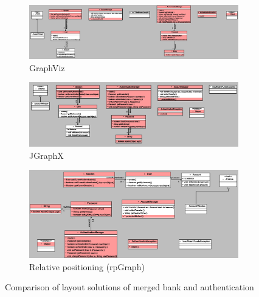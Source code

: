 \begin{figure}
	\centering
    \begin{subfigure}[b]{1\linewidth}
    	\includegraphics[width=\linewidth]{gv_bank.PNG}
        \caption{GraphViz}
        \label{figure : gv bank}
    \end{subfigure}
    \begin{subfigure}[b]{1\linewidth}
    	\includegraphics[width=\linewidth]{gx_bank.PNG}
        \caption{JGraphX}
        \label{figure : gx bank}
    \end{subfigure}
    \begin{subfigure}[b]{1\linewidth}
    	\includegraphics[width=\linewidth]{rp_bank.PNG}
        \caption{Relative positioning (rpGraph)}
        \label{figure : rp bank}
    \end{subfigure}
	\caption{Comparison of layout solutions of merged bank and authentication}
    \label{figure : bank solution}
\end{figure}

